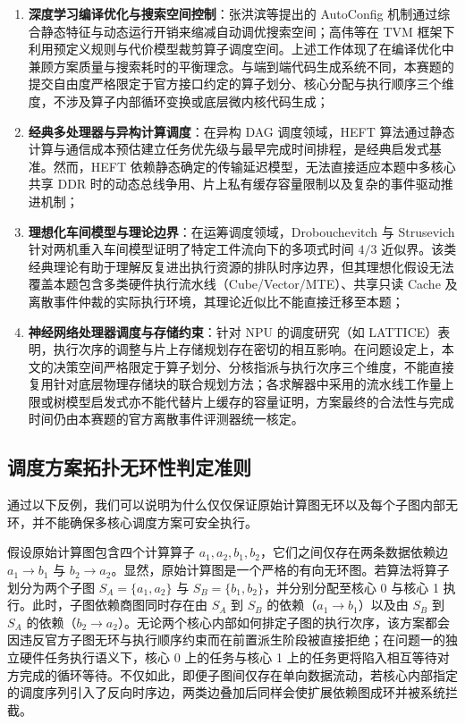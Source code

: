 \documentclass[anonymous,withtoc]{gmcm2026}
\providecommand{\tightlist}{\setlength{\itemsep}{0pt}\setlength{\parskip}{0pt}}
\begin{document}
\begin{enumerate}
\def\labelenumi{\arabic{enumi}.}
\tightlist
\item
  \textbf{深度学习编译优化与搜索空间控制}：张洪滨等提出的 AutoConfig 机制\cite{ref13}通过综合静态特征与动态运行开销来缩减自动调优搜索空间；高伟等在 TVM 框架下\cite{ref14}利用预定义规则与代价模型裁剪算子调度空间。上述工作体现了在编译优化中兼顾方案质量与搜索耗时的平衡理念。与端到端代码生成系统不同，本赛题的提交自由度严格限定于官方接口约定的算子划分、核心分配与执行顺序三个维度，不涉及算子内部循环变换或底层微内核代码生成；
\item
  \textbf{经典多处理器与异构计算调度}：在异构 DAG 调度领域，HEFT 算法\cite{ref15}通过静态计算与通信成本预估建立任务优先级与最早完成时间排程，是经典启发式基准。然而，HEFT 依赖静态确定的传输延迟模型，无法直接适应本题中多核心共享 DDR 时的动态总线争用、片上私有缓存容量限制以及复杂的事件驱动推进机制；
\item
  \textbf{理想化车间模型与理论边界}：在运筹调度领域，Drobouchevitch 与 Strusevich 针对两机重入车间模型\cite{ref16}证明了特定工件流向下的多项式时间 \(4/3\) 近似界。该类经典理论有助于理解反复进出执行资源的排队时序边界，但其理想化假设无法覆盖本题包含多类硬件执行流水线（Cube/Vector/MTE）、共享只读 Cache 及离散事件仲裁的实际执行环境，其理论近似比不能直接迁移至本题；
\item
  \textbf{神经网络处理器调度与存储约束}：针对 NPU 的调度研究（如 LATTICE\cite{ref17}）表明，执行次序的调整与片上存储规划存在密切的相互影响。在问题设定上，本文的决策空间严格限定于算子划分、分核指派与执行次序三个维度，不能直接复用针对底层物理存储块的联合规划方法；各求解器中采用的流水线工作量上限或树模型启发式亦不能代替片上缓存的容量证明，方案最终的合法性与完成时间仍由本赛题的官方离散事件评测器统一核定。
\end{enumerate}

\subsection{调度方案拓扑无环性判定准则}

通过以下反例，我们可以说明为什么仅仅保证原始计算图无环以及每个子图内部无环，并不能确保多核心调度方案可安全执行。

假设原始计算图包含四个计算算子 \(a_1, a_2, b_1, b_2\)，它们之间仅存在两条数据依赖边 \(a_1 \to b_1\) 与 \(b_2 \to a_2\)。显然，原始计算图是一个严格的有向无环图。若算法将算子划分为两个子图 \(S_A = \{a_1, a_2\}\) 与 \(S_B = \{b_1, b_2\}\)，并分别分配至核心 0 与核心 1 执行。此时，子图依赖商图同时存在由 \(S_A\) 到 \(S_B\) 的依赖（\(a_1 \to b_1\)）以及由 \(S_B\) 到 \(S_A\) 的依赖（\(b_2 \to a_2\)）。无论两个核心内部如何排定子图的执行次序，该方案都会因违反官方子图无环与执行顺序约束而在前置派生阶段被直接拒绝；在问题一的独立硬件任务执行语义下，核心 0 上的任务与核心 1 上的任务更将陷入相互等待对方完成的循环等待。不仅如此，即便子图间仅存在单向数据流动，若核心内部指定的调度序列引入了反向时序边，两类边叠加后同样会使扩展依赖图成环并被系统拦截。
\end{document}

